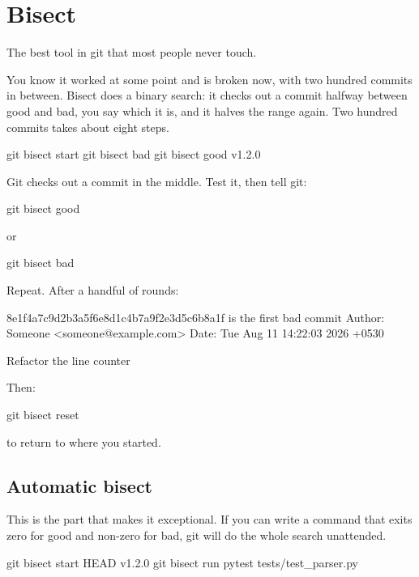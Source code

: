 \documentclass[11pt]{article}
\begin{document}
\section{Bisect}

The best tool in git that most people never touch.

You know it worked at some point and is broken now, with two hundred commits in
between. Bisect does a binary search: it checks out a commit halfway between good
and bad, you say which it is, and it halves the range again. Two hundred commits
takes about eight steps.

\begin{shell}
git bisect start
git bisect bad
git bisect good v1.2.0
\end{shell}

Git checks out a commit in the middle. Test it, then tell git:

\begin{shell}
git bisect good
\end{shell}

or

\begin{shell}
git bisect bad
\end{shell}

Repeat. After a handful of rounds:

\begin{terminal}
8e1f4a7c9d2b3a5f6e8d1c4b7a9f2e3d5c6b8a1f is the first bad commit
Author: Someone <someone@example.com>
Date:   Tue Aug 11 14:22:03 2026 +0530

    Refactor the line counter
\end{terminal}

Then:

\begin{shell}
git bisect reset
\end{shell}

to return to where you started.

\subsection{Automatic bisect}

This is the part that makes it exceptional. If you can write a command that exits
zero for good and non-zero for bad, git will do the whole search unattended.

\begin{shell}
git bisect start HEAD v1.2.0
git bisect run pytest tests/test_parser.py
\end{shell}
\end{document}
